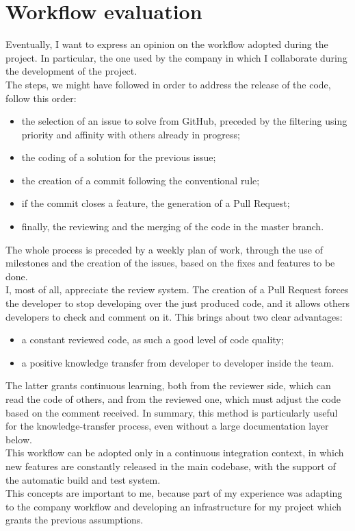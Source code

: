 
\section{Workflow evaluation}
Eventually, I want to express an opinion on the workflow adopted during the project. In particular, the one used by the company in which I collaborate during the development of the project. 
\\ The steps, we might have followed in order to address the release of the code, follow this order:
\begin{itemize}
    \item the selection of an issue to solve from GitHub, preceded by the filtering using priority and affinity with others already in progress;
    \item the coding of a solution for the previous issue;
    \item the creation of a commit following the conventional rule;
    \item if the commit closes a feature, the generation of a Pull Request;
    \item finally, the reviewing and the merging of the code in the master branch.
\end{itemize}
The whole process is preceded by a weekly plan of work, through the use of milestones and the creation of the issues, based on the fixes and features to be done.
\\ I, most of all, appreciate the review system. The creation of a Pull Request forces the developer to stop developing over the just produced code, and it allows others developers to check and comment on it. This brings about two clear advantages:
\begin{itemize}
    \item a constant reviewed code, as such a good level of code quality;
    \item a positive knowledge transfer from developer to developer inside the team.
\end{itemize}
The latter grants continuous learning, both from the reviewer side, which can read the code of others, and from the reviewed one, which must adjust the code based on the comment received. In summary, this method is particularly useful for the knowledge-transfer process, even without a large documentation layer below.
\\ This workflow can be adopted only in a continuous integration context, in which new features are constantly released in the main codebase, with the support of the automatic build and test system.
\\ This concepts are important to me, because part of my experience was adapting to the company workflow and developing an infrastructure for my project which grants the previous assumptions.